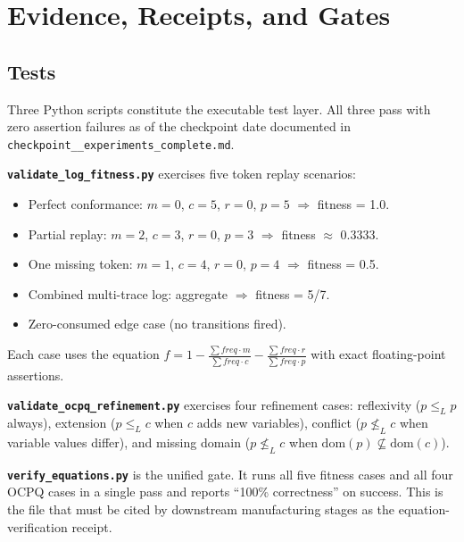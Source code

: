
\section{Evidence, Receipts, and Gates}
\label{sec:experiments-core-evidence}

\subsection{Tests}
\label{sec:experiments-core-evidence-tests}

Three Python scripts constitute the executable test layer. All three pass with zero
assertion failures as of the checkpoint date documented in
\texttt{checkpoint\_\_experiments\_complete.md}.

\textbf{\texttt{validate\_log\_fitness.py}} exercises five token replay scenarios:
\begin{itemize}
  \item Perfect conformance: $m=0$, $c=5$, $r=0$, $p=5$ $\Rightarrow$ fitness = 1.0.
  \item Partial replay: $m=2$, $c=3$, $r=0$, $p=3$ $\Rightarrow$ fitness $\approx$ 0.3333.
  \item One missing token: $m=1$, $c=4$, $r=0$, $p=4$ $\Rightarrow$ fitness = 0.5.
  \item Combined multi-trace log: aggregate $\Rightarrow$ fitness = 5/7.
  \item Zero-consumed edge case (no transitions fired).
\end{itemize}
Each case uses the equation
$f = 1 - \frac{\sum \mathit{freq} \cdot m}{\sum \mathit{freq} \cdot c} - \frac{\sum \mathit{freq} \cdot r}{\sum \mathit{freq} \cdot p}$
with exact floating-point assertions.

\textbf{\texttt{validate\_ocpq\_refinement.py}} exercises four refinement cases:
reflexivity ($p \leq_L p$ always), extension ($p \leq_L c$ when $c$ adds new
variables), conflict ($p \not\leq_L c$ when variable values differ), and missing
domain ($p \not\leq_L c$ when $\mathrm{dom}(p) \not\subseteq \mathrm{dom}(c)$).

\textbf{\texttt{verify\_equations.py}} is the unified gate. It runs all five fitness
cases and all four OCPQ cases in a single pass and reports ``100\% correctness'' on
success. This is the file that must be cited by downstream manufacturing stages as
the equation-verification receipt.

